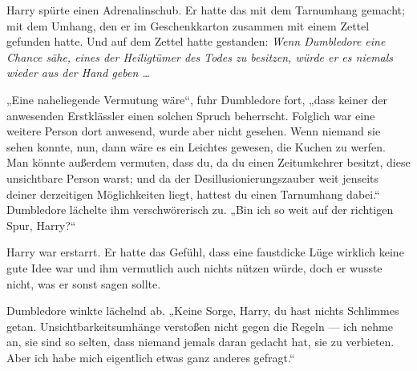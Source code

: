 Harry spürte einen Adrenalinschub. Er hatte das mit dem Tarnumhang gemacht; mit dem Umhang, den er im Geschenkkarton zusammen mit einem Zettel gefunden hatte. Und auf dem Zettel hatte gestanden: \emph{Wenn Dumbledore eine Chance sähe, eines der Heiligtümer des Todes zu besitzen, würde er es niemals wieder aus der Hand geben …}

„Eine naheliegende Vermutung wäre“, fuhr Dumbledore fort, „dass keiner der anwesenden Erstklässler einen solchen Spruch beherrscht. Folglich war eine weitere Person dort anwesend, wurde aber nicht gesehen. Wenn niemand sie sehen konnte, nun, dann wäre es ein Leichtes gewesen, die Kuchen zu werfen. Man könnte außerdem vermuten, dass du, da du einen Zeitumkehrer besitzt, diese unsichtbare Person warst; und da der Desillusionierungszauber weit jenseits deiner derzeitigen Möglichkeiten liegt, hattest du einen Tarnumhang dabei.“ Dumbledore lächelte ihm verschwörerisch zu.
„Bin ich so weit auf der richtigen Spur, Harry?“

Harry war erstarrt. Er hatte das Gefühl, dass eine faustdicke Lüge wirklich keine gute Idee war und ihm vermutlich auch nichts nützen würde, doch er wusste nicht, was er sonst sagen sollte.

Dumbledore winkte lächelnd ab.
„Keine Sorge, Harry, du hast nichts Schlimmes getan. Unsichtbarkeitsumhänge verstoßen nicht gegen die Regeln — ich nehme an, sie sind so selten, dass niemand jemals daran gedacht hat, sie zu verbieten. Aber ich habe mich eigentlich etwas ganz anderes gefragt.“

